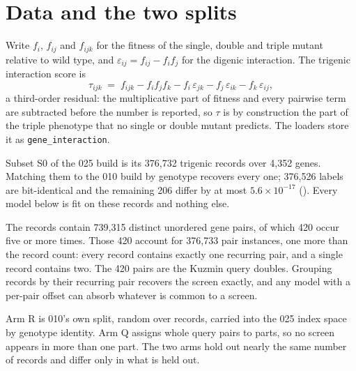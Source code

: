 
\section{Data and the two splits}
\label{sec:data}

Write $f_i$, $f_{ij}$ and $f_{ijk}$ for the fitness of the single, double and triple
mutant relative to wild type, and $\varepsilon_{ij} = f_{ij} - f_i f_j$ for the
digenic interaction. The trigenic interaction score is
%
\begin{equation}
  \tau_{ijk} \;=\; f_{ijk} - f_i f_j f_k
  - f_i\,\varepsilon_{jk} - f_j\,\varepsilon_{ik} - f_k\,\varepsilon_{ij} ,
  \label{eq:tau}
\end{equation}
%
a third-order residual: the multiplicative part of fitness and every pairwise term
are subtracted before the number is reported, so $\tau$ is by construction the part
of the triple phenotype that no single or double mutant predicts. The loaders store
it as \texttt{gene\_interaction}.

Subset S0 of the 025 build is its 376{,}732 trigenic records over 4{,}352 genes.
Matching them to the 010 build by genotype recovers every one; 376{,}526 labels are
bit-identical and the remaining 206 differ by at most $5.6 \times 10^{-17}$
(). Every
model below is fit on these records and nothing else.

The records contain 739{,}315 distinct unordered gene pairs, of which 420 occur five
or more times. Those 420 account for 376{,}733 pair instances, one more than the
record count: every record contains exactly one recurring pair, and a single record
contains two. The 420 pairs are the Kuzmin query doubles. Grouping records by their
recurring pair recovers the screen exactly, and any model with a per-pair offset can
absorb whatever is common to a screen.

Arm R is 010's own split, random over records, carried into the 025 index space by
genotype identity. Arm Q assigns whole query pairs to parts, so no screen appears in
more than one part. The two arms hold out nearly the same number of records and
differ only in what is held out.

